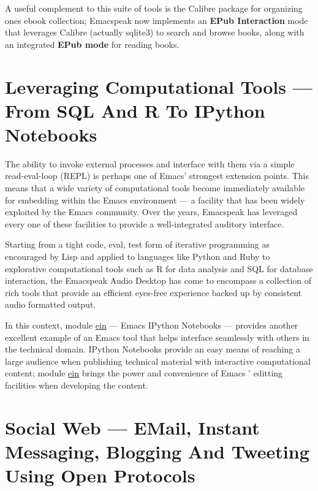 \documentclass[11pt]{article}
\begin{document}
A useful complement to this suite of tools is the Calibre package
for organizing ones ebook collection; Emacspeak now implements an
\textbf{EPub Interaction} mode that leverages Calibre (actually sqlite3)
to search and browse books, along with an integrated \textbf{EPub mode}
for reading books.

\section{Leveraging Computational Tools —  From SQL And R To IPython Notebooks}
\label{sec-12}

The ability to invoke external processes and interface with them
via a simple read-eval-loop (REPL) is perhaps one of Emacs'
strongest extension points. This means that a wide variety of
computational tools become immediately available for embedding
within the Emacs environment — a facility that has been widely
exploited by the Emacs community. Over the years, Emacspeak has
leveraged every one of these facilities to provide a
well-integrated auditory interface.

Starting from a tight code, eval, test form of iterative
programming as encouraged by Lisp and applied to languages like
Python and Ruby to explorative computational tools such as R for
data analysis and SQL for database interaction, the Emacspeak
Audio Desktop has come to encompass a collection of rich tools
that provide an efficient eyes-free experience backed up by
consistent audio formatted output.

In this context, module \uline{ein} — Emacs IPython Notebooks — 
provides another excellent example of an Emacs tool that helps
interface seamlessly with others in the technical domain. IPython
Notebooks provide an easy means of reaching a large audience when
publishing technical material with interactive computational
content; module \uline{ein} brings the power and convenience of Emacs
' editting facilities when developing the content.


\section{Social Web  — EMail, Instant Messaging, Blogging  And Tweeting Using Open Protocols}
\label{sec-13}
\end{document}
